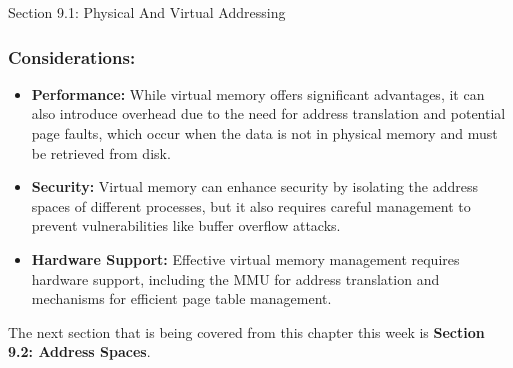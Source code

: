 \begin{notes}{Section 9.1: Physical And Virtual Addressing}
    \subsubsection*{Considerations:}
    
    \begin{itemize}
        \item \textbf{Performance:} While virtual memory offers significant advantages, it can also introduce overhead due to the need for address translation and potential page faults, which occur 
        when the data is not in physical memory and must be retrieved from disk.
        \item \textbf{Security:} Virtual memory can enhance security by isolating the address spaces of different processes, but it also requires careful management to prevent vulnerabilities like 
        buffer overflow attacks.
        \item \textbf{Hardware Support:} Effective virtual memory management requires hardware support, including the MMU for address translation and mechanisms for efficient page table management.
    \end{itemize}    
\end{notes}

The next section that is being covered from this chapter this week is \textbf{Section 9.2: Address Spaces}.

